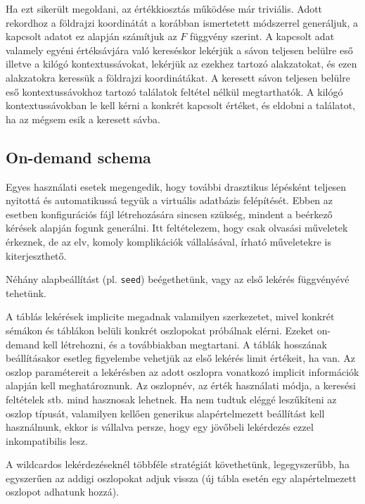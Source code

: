 \documentclass[
    parspace,
    noindent,
    nohyp,
]{elteiktdk}[2023/04/10]
\newcommand{\todoref}[1]{\todo[inline, noinlinepar, color=red, textcolor=white, inlinewidth=0.6cm, caption={#1}]{\large \textbf{×}}}
\begin{document}
Ha ezt sikerült megoldani, az értékkiosztás működése már triviális.
Adott rekordhoz a földrajzi koordinátát a korábban ismertetett módszerrel generáljuk,
a kapcsolt adatot ez alapján számítjuk az $F$ függvény szerint.
A kapcsolt adat valamely egyéni értéksávjára való kereséskor
lekérjük a sávon teljesen belülre eső illetve a kilógó kontextussávokat,
lekérjük az ezekhez tartozó alakzatokat,
és ezen alakzatokra keressük a földrajzi koordinátákat.
A keresett sávon teljesen belülre eső kontextussávokhoz tartozó találatok feltétel nélkül megtarthatók.
A kilógó kontextussávokban le kell kérni a konkrét kapcsolt értéket,
és eldobni a találatot, ha az mégsem esik a keresett sávba.

\subsection{On-demand schema}

\todoref{On-demand schema: inkább: dev-mode és zero-mode}
\todoref{Zero-mode: garancia-szintek}

Egyes használati esetek megengedik,
hogy további drasztikus lépésként teljesen nyitottá és automatikussá tegyük a virtuális adatbázis felépítését.
Ebben az esetben konfigurációs fájl létrehozására sincsen szükség,
mindent a beérkező kérések alapján fogunk generálni.
Itt feltételezem, hogy csak olvasási műveletek érkeznek,
de az elv, komoly komplikációk vállalásával, írható műveletekre is kiterjeszthető.

Néhány alapbeállítást (pl. \texttt{seed}) beégethetünk, vagy az első lekérés függvényévé tehetünk.

A táblás lekérések implicite megadnak valamilyen szerkezetet,
mivel konkrét sémákon és táblákon belüli konkrét oszlopokat próbálnak elérni.
Ezeket on-demand kell létrehozni, és a továbbiakban megtartani.
A táblák hosszának beállításakor esetleg figyelembe vehetjük az első lekérés limit értékeit, ha van.
Az oszlop paramétereit a lekérésben az adott oszlopra vonatkozó
implicit információk alapján kell meghatároznunk.
Az oszlopnév, az érték használati módja, a keresési feltételek stb.
mind hasznosak lehetnek.
Ha nem tudtuk eléggé leszűkíteni az oszlop típusát,
valamilyen kellően generikus alapértelmezett beállítást kell használnunk,
ekkor is vállalva persze, hogy egy jövőbeli lekérdezés ezzel inkompatibilis lesz.

A wildcardos lekérdezéseknél többféle stratégiát követhetünk,
legegyszerűbb, ha egyszerűen az addigi oszlopokat adjuk vissza
(új tábla esetén egy alapértelmezett oszlopot adhatunk hozzá).
\end{document}
